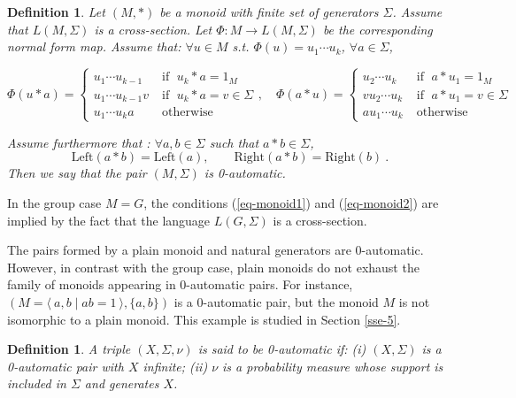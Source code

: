 \documentclass[11pt,a4paper]{article}
\newtheorem{definition}[theorem]{Definition}
\theoremstyle{remark}
\newcommand{\pres}[2]{\langle \: #1 \mid #2 \: \rangle}
\def\leftt{\text{Left}}
\def\rightt{\text{Right}}
\def\eref#1{(\ref{#1})}
\begin{document}
\begin{definition}\label{de-0autmonoid}
Let $(M,\ast)$ be a monoid with finite set of generators $\Sigma$.
Assume that $L(M,\Sigma)$ is
a cross-section. Let $\Phi : M \rightarrow L(M,\Sigma)$ be the
corresponding normal form map. Assume that: $\forall u \in M$ s.t. 
$\Phi(u) = u_{1}\cdots u_{k}$, $\forall a \in \Sigma$,

\begin{equation}\label{eq-monoid1}
\Phi(u\ast a) = \left \{ \begin{array}{ll}
u_{1}\cdots u_{k-1} \; & \mbox{if } \; u_{k} \ast a = 1_{M} \\
u_{1}\cdots u_{k-1}v \; & \mbox{if } \; u_{k} \ast a = v \in \Sigma \\
u_{1}\cdots u_{k}a \; & \mbox{otherwise}
\end{array}\right., \quad
\Phi(a\ast u) = \left \{ \begin{array}{ll}
u_{2}\cdots u_{k} \; & \mbox{if } \; a \ast u_{1} = 1_{M} \\
vu_{2}\cdots u_{k} \; & \mbox{if } \; a \ast u_{1} = v \in \Sigma \\
au_{1}\cdots u_{k} \; & \mbox{otherwise}
\end{array} \right.
\end{equation}

Assume furthermore that : $\forall a,b \in \Sigma $ such that $a
\ast b \in \Sigma$,
\begin{equation}\label{eq-monoid2}
\leftt(a\ast b)=\leftt(a),\qquad \rightt(a\ast b) = \rightt(b) \:.
\end{equation}
Then we say that the pair $(M,\Sigma)$ is 0-automatic.
\end{definition}

In the group case $M=G$, the conditions \eref{eq-monoid1} and
\eref{eq-monoid2} are implied by the fact that the language
$L(G,\Sigma)$ is a cross-section. 

\medskip

The pairs formed by a plain monoid and natural generators are
0-automatic. However, in contrast
with the group case, plain monoids do not exhaust the family
of monoids appearing in 0-automatic pairs. For instance, 
$(M=\pres{a,b}{ab=1},\{a,b\})$ is a 0-automatic pair, but the monoid $M$
is not isomorphic to a plain 
monoid. This example is studied in Section \ref{sse-5}. 

\begin{definition}\label{de-0aut4}
A triple $(X,\Sigma,\nu)$ is said to be {\em 0-automatic} if: (i)
$(X,\Sigma)$ is a 0-automatic pair with $X$ infinite; (ii) $\nu$ is a
probability measure whose support is included in $\Sigma$ and
generates $X$.
\end{definition}
\end{document}
